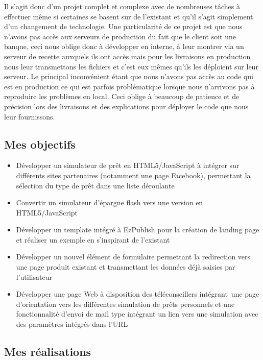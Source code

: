 \documentclass[a4paper,11pt,twoside]{report}
\begin{document}
    Il s'agit donc d'un projet complet et complexe avec de nombreuses tâches à effectuer même si certaines se basent sur de l'existant et qu'il s'agit simplement d'un changement de technologie. Une particularité de ce projet est que nous n'avons pas accès aux serveurs de production du fait que le client soit une banque, ceci nous oblige donc à développer en interne, à leur montrer via un serveur de recette auxquels ils ont accès mais pour les livraisons en production nous leur transmettons les fichiers et c'est eux mêmes qu'ils les déploient sur leur serveur. Le principal inconvénient étant que nous n'avons pas accès au code qui est en production ce qui est parfois problématique lorsque nous n'arrivons pas à reproduire les problèmes en local. Ceci oblige à beaucoup de patience et de précision lors des livraisons et des explications pour déployer le code que nous leur fournissons.  
    \subsection*{Mes objectifs}
      \begin{itemize}

	\item Développer un simulateur de prêt en HTML5/JavaScript à intégrer sur différents sites partenaires (notamment une page Facebook), permettant la sélection du type de prêt dans une liste déroulante
	\item Convertir un simulateur d'épargne flash vers une version en HTML5/JavaScript 
	\item Développer un template intégré à EzPublish pour la création de landing page et réaliser un exemple en s'inspirant de l'existant
	\item Développer un nouvel élément de formulaire permettant la redirection vers une page produit existant et transmettant les données déjà saisies par l'utilisateur
 	\item Développer une page Web à disposition des téléconseillers intégrant une page d’orientation vers les différentes simulation de prêts personnels et une fonctionnalité d’envoi de mail type intégrant un lien vers une simulation avec des paramètres intégrés dans l’URL

      \end{itemize}
    \subsection*{Mes réalisations}
\end{document}

